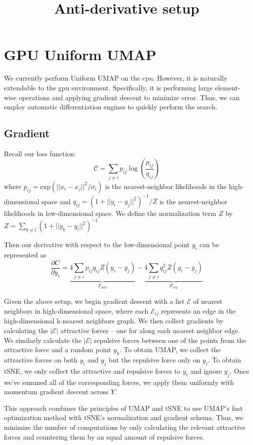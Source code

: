 \documentclass{article}
\title{Anti-derivative setup}
\theoremstyle{definition}
\begin{document}
\maketitle
\section{GPU Uniform UMAP}

We currently perform Uniform UMAP on the cpu. However, it is naturally extendable to the gpu environment. Specifically, it is performing large element-wise
operations and applying gradient descent to minimize error. Thus, we can employ automatic differentiation engines to quickly perform the search.

\subsection{Gradient}
Recall our loss
function:
\[ \mathcal{C} = \sum_{j \neq i} p_{ij} \log \left( \dfrac{p_{ij}}{q_{ij}}  \right) \]
where $p_{ij} = \text{exp}\left( ||x_i - x_j||^2 / \sigma_i \right)$ is the nearest-neighbor likelihoods in the high-dimensional space and  $q_{ij} = (1 + ||y_i
- y_j||^2)^{-1} / Z$ is the nearest-neighbor likelihoods in low-dimensional space. We define the normalization term $Z$ by $Z = \sum_{k \neq l} (1 + ||y_k
- y_l||^2)^{-1}$

Then our derivative with respect to the low-dimensional point $y_i$ can be represented as
\[ \dfrac{\partial C}{\partial y_i} = \underbrace{4 \sum_{j \neq i} p_{ij} q_{ij} Z (y_i - y_j)}_{F_{attr}} - \underbrace{4 \sum_{j \neq i} q_{ij}^2 Z (y_i
- y_j)}_{F_{rep}} \]

Given the above setup, we begin gradient descent with a list $\mathcal{E}$ of nearest neighbors in high-dimensional space, where each $\mathcal{E}_{ij}$
represents an edge in the high-dimensional k-nearest neighbors graph. We then collect gradients by calculating the $|\mathcal{E}|$ attractive forces -- one for
along each nearest neighbor edge. We similarly calculate the $|\mathcal{E}|$ repulsive forces between one of the points from the attractive force and a random point $y_k$.
To obtain UMAP, we collect the attractive forces on both $y_i$ and $y_j$ but the repulsive force only on $y_i$. To obtain tSNE, we only collect the attractive and
repulsive forces to $y_i$ and ignore $y_j$. Once we've summed all of the corresponding forces, we apply them uniformly with momentum gradient descent across $Y$.

This approach combines the principles of UMAP and tSNE to use UMAP's fast optimization method with tSNE's normalization and gradient schema. Thus, we minimize
the number of computations by only calculating the relevant attractive forces and countering them by an equal amount of repulsive forces.
\end{document}
